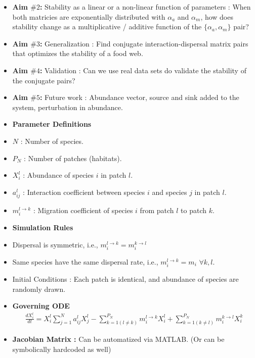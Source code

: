 \documentclass[12pt]{article}
\begin{document}
\begin{itemize}
\item \textbf{Aim $\#2$: } Stability as a linear or a non-linear function of parameters : When both matricies are exponentially distributed with $\alpha_a$ and $\alpha_m$, how does stability change as a multiplicative / additive function of the $\{\alpha_a,\alpha_m\}$ pair?
\item \textbf{Aim $\#3$: } Generalization : Find conjugate interaction-dispersal matrix pairs that optimizes the stability of a food web.
\item \textbf{Aim $\#4$: } Validation : Can we use real data sets do validate the stability of the conjugate pairs?
\item \textbf{Aim $\#5$: } Future work :  Abundance vector, source and sink added to the system, perturbation in abundance.
\item [] \textbf{Parameter Definitions}
\item $N$ : Number of species.
\item $P_N$ : Number of patches (habitats). 
\item $X_{i}^{l}$ : Abundance of species $i$ in patch $l$.
\item $a_{ij}^{l}$ : Interaction coefficient between species $i$ and species $j$ in patch $l$.
\item $m_{i}^{l \rightarrow k}$ : Migration coefficient of species $i$ from patch $l$ to patch $k$.
\item [] \textbf{Simulation Rules}
\item Dispersal is symmetric, i.e.,  $m_{i}^{l \rightarrow k}=m_{i}^{k \rightarrow l}$
\item Same species have the same dispersal rate, i.e., $m_{i}^{l \rightarrow k} = m_{i}\,\, \forall k, l.$
\item Initial Conditions : Each patch is identical, and abundance of species are randomly drawn.
\item \textbf{Governing ODE}
\begin{align}
\frac{dX_{i}^{l}}{dt} = X_{i}^{l}\sum_{j=1}^{N}a_{ij}^{l}X_{j}^{l} - \sum_{k=1 (l \neq k)}^{P_N}m_{i}^{l \rightarrow k} X_{i}^{l}+ \sum_{k=1 (k \neq l)}^{P_N}m_{i}^{k \rightarrow l}X_{i}^{k}
\end{align}
\item \textbf{Jacobian Matrix : }Can be automatized via MATLAB. (Or can be symbolically hardcoded as well) 
\end{itemize}
\end{document}
